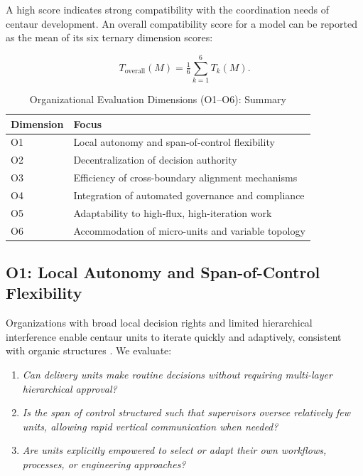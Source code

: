 \documentclass[11pt, a4paper, twocolumn]{article} %
\begin{document}
\medskip
A high score indicates strong compatibility with the coordination needs of
centaur development. An overall compatibility score for a model can be reported
as the mean of its six ternary dimension scores:

\[
T_{\text{overall}}(M) = \tfrac{1}{6}\sum_{k=1}^{6} T_k(M).
\]

\begin{table}[h]
\centering
\caption{Organizational Evaluation Dimensions (O1--O6): Summary}
\label{tab:org-dimension-summary}
\begin{tabular}{ll}
\toprule
\textbf{Dimension} & \textbf{Focus} \\
\midrule
O1 & Local autonomy and span-of-control flexibility \\
O2 & Decentralization of decision authority \\
O3 & Efficiency of cross-boundary alignment mechanisms \\
O4 & Integration of automated governance and compliance \\
O5 & Adaptability to high-flux, high-iteration work \\
O6 & Accommodation of micro-units and variable topology \\
\bottomrule
\end{tabular}
\end{table}

\newpage

\subsection*{O1: Local Autonomy and Span-of-Control Flexibility}

Organizations with broad local decision rights and limited hierarchical
interference enable centaur units to iterate quickly and adaptively, consistent
with organic structures \citep{burnsstalker1961,mintzberg1979}. We evaluate:

\begin{enumerate}[label=O1.\arabic*), leftmargin=*]
    \item \emph{Can delivery units make routine decisions without requiring
    multi-layer hierarchical approval?}
    \item \emph{Is the span of control structured such that supervisors oversee
    relatively few units, allowing rapid vertical communication when needed?}
    \item \emph{Are units explicitly empowered to select or adapt their own
    workflows, processes, or engineering approaches?}
\end{enumerate}
\end{document}
